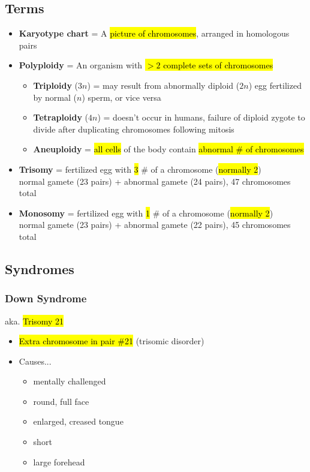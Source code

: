 \documentclass[a4paper,12pt]{article}
\begin{document}
\subsection{Terms}
\begin{itemize}
    \item{\textbf{Karyotype chart} = A \hl{picture of chromosomes}, arranged in homologous pairs}
    \item{
            \textbf{Polyploidy} = An organism with \hl{$>2$ complete sets of chromosomes}
            \begin{itemize}
                \item{\textbf{Triploidy} ($3n$) = may result from abnormally diploid ($2n$) egg fertilized by normal ($n$) sperm, or vice versa}
                \item{\textbf{Tetraploidy} ($4n$) = doesn't occur in humans, failure of diploid zygote to divide after duplicating chromosomes following mitosis}
                \item{\textbf{Aneuploidy} = \hl{all cells} of the body contain \hl{abnormal \# of chromosomes}}
            \end{itemize}
        }
    \item{\textbf{Trisomy} = fertilized egg with \hl{3} \# of a chromosome (\hl{normally 2}) \\ normal gamete (23 pairs) + abnormal gamete (24 pairs), 47 chromosomes total}
    \item{\textbf{Monosomy} = fertilized egg with \hl{1} \# of a chromosome (\hl{normally 2}) \\ normal gamete (23 pairs) + abnormal gamete (22 pairs), 45 chromosomes total}
\end{itemize}

\subsection{Syndromes}

\subsubsection{Down Syndrome}
aka. \hl{Trisomy 21}

\begin{itemize}
    \item{\hl{Extra chromosome in pair \#21} (trisomic disorder)}
    \item{
            Causes...
            \begin{itemize}
                \item{mentally challenged}
                \item{round, full face}
                \item{enlarged, creased tongue}
                \item{short}
                \item{large forehead}
            \end{itemize}
        }
\end{itemize}
\end{document}

